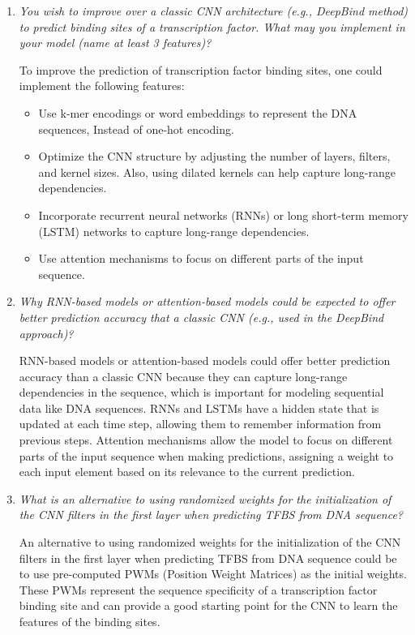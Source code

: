 \documentclass[a4paper]{article}
\begin{document}
\begin{enumerate}
  \item \textit{You wish to improve over a classic CNN architecture (e.g., DeepBind method) to predict binding
  sites of a transcription factor. What may you implement in your model (name at least 3 features)?}
  
  To improve the prediction of transcription factor binding sites, one could implement the following features:

  \begin{itemize}
    \item Use k-mer encodings or word embeddings to represent the DNA sequences, Instead of one-hot encoding.
    \item Optimize the CNN structure by adjusting the number of layers, filters, and kernel sizes. 
    Also, using dilated kernels can help capture long-range dependencies. 
    \item Incorporate recurrent neural networks (RNNs) or long short-term memory (LSTM) networks to capture long-range dependencies.
    \item Use attention mechanisms to focus on different parts of the input sequence.
  \end{itemize}

  \item \textit{Why RNN-based models or attention-based models could be expected to offer better prediction
  accuracy that a classic CNN (e.g., used in the DeepBind approach)?}

  RNN-based models or attention-based models could offer better prediction accuracy 
  than a classic CNN because they can capture long-range dependencies in the sequence,
  which is important for modeling sequential data like DNA sequences. RNNs and LSTMs
  have a hidden state that is updated at each time step, allowing them to remember
  information from previous steps. Attention mechanisms allow the model to focus on
  different parts of the input sequence when making predictions, assigning a weight
  to each input element based on its relevance to the current prediction.
  
  \item \textit{What is an alternative to using randomized weights for the initialization of the CNN filters in the first
  layer when predicting TFBS from DNA sequence?}
  
  An alternative to using randomized weights for the initialization of the CNN filters
  in the first layer when predicting TFBS from DNA sequence could be to use
  pre-computed PWMs (Position Weight Matrices) as the initial weights. These PWMs
  represent the sequence specificity of a transcription factor binding site and can
  provide a good starting point for the CNN to learn the features of the binding sites.
  
\end{enumerate}
\end{document}
